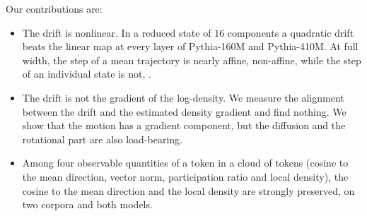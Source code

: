 \documentclass[mlmain]{jmlr}
\begin{document}
Our contributions are:
\begin{itemize}
  \item The drift is nonlinear. In a reduced state of $16$ components a quadratic drift beats the linear map at every layer of Pythia-160M and Pythia-410M. At full width, the step of a mean trajectory is nearly affine, \crFwShareMedRound{} non-affine, while the step of an individual state is not, \crOccFwShareMed{}. 
  \item The drift is not the gradient of the log-density. We measure the alignment between the drift and the estimated density gradient and find nothing. 
  We show that the motion has a gradient component, but the diffusion and the rotational part are also load-bearing. 
  \item Among four observable quantities of a token in a cloud of tokens (cosine to the mean direction, vector norm, participation ratio and local density),
  the cosine to the mean direction and the local density are strongly preserved, on two corpora and both models.
\end{itemize}




\end{document}
